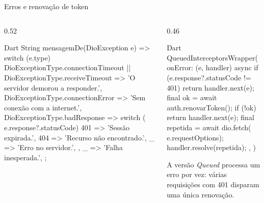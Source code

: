 \documentclass[aspectratio=169,10pt]{beamer}
\begin{document}
\begin{frame}[fragile]{Erros e renovação de token}
  \begin{columns}[T]
    \begin{column}{0.52\textwidth}
\begin{codigo}[title=Traduzindo DioException]{Dart}
String mensagemDe(DioException e) => switch (e.type) {
  DioExceptionType.connectionTimeout ||
  DioExceptionType.receiveTimeout =>
      'O servidor demorou a responder.',
  DioExceptionType.connectionError =>
      'Sem conexão com a internet.',
  DioExceptionType.badResponse => switch (
      e.response?.statusCode) {
    401 => 'Sessão expirada.',
    404 => 'Recurso não encontrado.',
    _ => 'Erro no servidor.',
  },
  _ => 'Falha inesperada.',
};
\end{codigo}
    \end{column}
    \begin{column}{0.46\textwidth}
\begin{codigo}[title=Renovando o token após 401]{Dart}
QueuedInterceptorsWrapper(
  onError: (e, handler) async {
    if (e.response?.statusCode != 401) {
      return handler.next(e);
    }
    final ok = await auth.renovarToken();
    if (!ok) return handler.next(e);
    final repetida = await dio.fetch(
        e.requestOptions);
    handler.resolve(repetida);
  },
)
\end{codigo}
      \begin{dica}
        A versão \emph{Queued} processa um erro por vez: várias requisições com 401 disparam uma única renovação.
      \end{dica}
    \end{column}
  \end{columns}
\end{frame}
\end{document}
